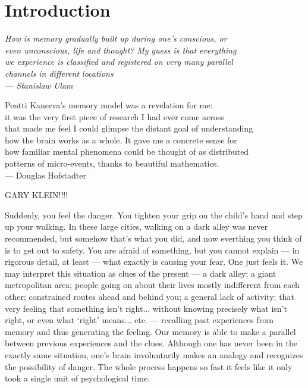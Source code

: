 
\chapter{Introduction}

\bigskip

\begin{flushright}{\slshape
    {How is memory gradually built up during one's conscious, or\\
    even unconscious, life and thought?  My guess is that everything \\
    we experience is classified and registered on very many parallel \\
    channels in different locations} \\ \medskip
    --- Stanislaw Ulam}

    \bigskip
    \bigskip
    {Pentti Kanerva's memory model was a revelation for me: \\
it was the very first piece of research I had ever come across\\
that made me feel I could glimpse the distant goal of understanding \\
how the brain works as a whole. It gave me a concrete sense for\\
how familiar mental phenomena could be thought of as distributed\\
patterns of micro-events, thanks to beautiful mathematics.} \\ \medskip
--- Douglas Hofstadter


\end{flushright}
\bigskip
\bigskip



GARY KLEIN!!!!



Suddenly, you feel the danger.  You tighten your grip on the child's hand and step up your walking.  In these large cities, walking on a dark alley was never recommended, but somehow that's what you did, and now everthing you think of is to get out to safety.  You are afraid of something, but you cannot explain --- in rigorous detail, at least --- what exactly is causing your fear. One just feels it. We may interpret this situation as clues of the present --- a dark alley; a giant metropolitan area; people going on about their lives mostly indifferent from each other; constrained routes ahead and behind you; a general lack of activity; that very feeling that something isn't right... without knowing precisely what isn't right, or even what `right' means... etc. --- recalling past experiences from memory and thus generating the feeling. Our memory is able to make a parallel between previous experiences and the clues. Although one has never been in the exactly same situation, one's brain involuntarily makes an analogy and recognizes the possibility of danger. The whole process happens so fast it feels like it only took a single unit of psychological time.

